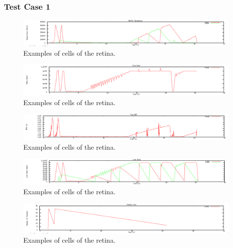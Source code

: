 \documentclass[12pt]{article}
\begin{document}
\newpage

\subsubsection{Test Case 1}

\begin{figure}[!ht]
\centering \includegraphics[bb= 0 0 1300 250, scale=.35]{figures/Test1_Tahoe/buffer_occ.png}
\caption{Examples of cells of the retina.}
\label{fig:test1_tahoe_buffer_occ}
\end{figure}

\begin{figure}[!ht]
\centering \includegraphics[bb= 0 0 1300 250, scale=.35]{figures/Test1_Tahoe/flow_rate.png}
\caption{Examples of cells of the retina.}
\label{fig:test1_tahoe_flow_rate}
\end{figure}

\begin{figure}[!ht]
\centering \includegraphics[bb= 0 0 1300 250, scale=.35]{figures/Test1_Tahoe/flow_rtt.png}
\caption{Examples of cells of the retina.}
\label{fig:test1_tahoe_flow_rtt}
\end{figure}

\begin{figure}[!ht]
\centering \includegraphics[bb= 0 0 1300 250, scale=.35]{figures/Test1_Tahoe/link_rate.png}
\caption{Examples of cells of the retina.}
\label{fig:test1_tahoe_link_rate}
\end{figure}

\begin{figure}[!ht]
\centering \includegraphics[bb= 0 0 1300 250, scale=.35]{figures/Test1_Tahoe/packet_loss.png}
\caption{Examples of cells of the retina.}
\label{fig:test1_tahoe_packet_loss}
\end{figure}
\end{document}
